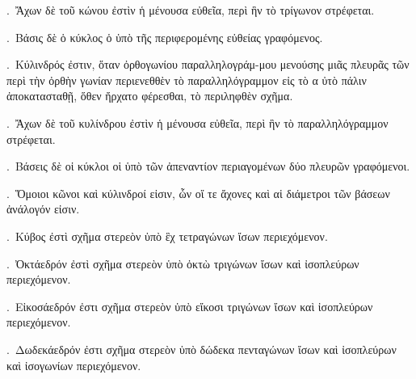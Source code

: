 \begin{Parallel}{}{}
{\ParallelPar

.~{\greekfont Ἄχων δὲ τοῦ κώνου ἐστὶν ἡ μένουσα εὐθεῖα, περὶ
ἣν τὸ τρίγωνον στρέφεται.}

\ParallelPar

.~{\greekfont Βάσις δὲ ὁ κύκλος ὁ ὑπὸ τῆς περιφερομένης εὐθείας  γραφόμενος.}


\ParallelPar
{}.~{\greekfont Κύλινδρός ἐστιν, ὅταν ὀρθογωνίου παραλληλογράμ-μου μενούσης μιᾶς πλευρᾶς τῶν περὶ τὴν ὀρθὴν γωνίαν περιενεθθὲν τὸ
παραλληλόγραμμον εἰς τὸ α ὐτὸ πάλιν ἀποκατασταθῇ, ὅθεν ἤρχατο
φέρεσθαι,
τὸ περιληφθὲν σχῆμα.}

\ParallelPar

.~{\greekfont Ἄχων δὲ τοῦ κυλίνδρου ἐστὶν ἡ μένουσα εὐθεῖα,
περὶ ἣν τὸ παραλληλόγραμμον στρέφεται.}

\ParallelPar

.~{\greekfont Βάσεις δὲ οἱ κύκλοι οἱ ὑπὸ τῶν ἀπεναντίον περιαγομένων
δύο πλευρῶν γραφόμενοι.}

\ParallelPar

.~{\greekfont Ὅμοιοι κῶνοι καὶ κύλινδροί εἰσιν, ὧν οἵ τε ἄχονες καὶ
αἱ διάμετροι τῶν βάσεων ἀνάλογόν εἰσιν.}

\ParallelPar

.~{\greekfont Κύβος ἐστὶ σχῆμα στερεὸν ὑπὸ ἓχ τετραγώνων ἴσων
περιεχόμενον.}

\ParallelPar

.~{\greekfont Ὀκτάεδρόν ἐστὶ σχῆμα στερεὸν ὑπὸ ὀκτὼ τριγώνων 
ἴσων καὶ ἰσοπλεύρων περιεχόμενον.}

\ParallelPar

.~{\greekfont Εἰκοσάεδρόν ἐστι σχῆμα στερεὸν ὑπὸ εἴκοσι τριγώνων
ἴσων καὶ ἰσοπλεύρων περιεχόμενον.}

\ParallelPar

.~{\greekfont Δωδεκάεδρόν ἐστι σχῆμα στερεὸν ὑπὸ δώδεκα πενταγώνων
ἴσων καὶ ἰσοπλεύρων καὶ ἰσογωνίων περιεχόμενον.}}

\end{Parallel}
